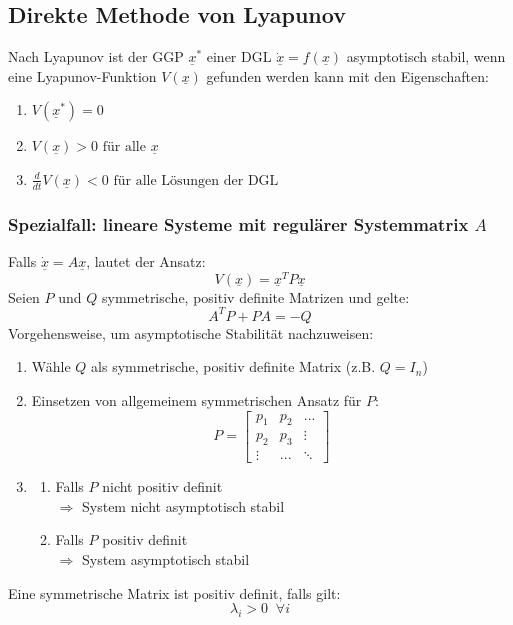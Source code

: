 \documentclass[a4paper,twocolumn,10pt]{article}
\begin{document}
\subsection{Direkte Methode von Lyapunov}
Nach Lyapunov ist der GGP $\underline{x}^*$ einer DGL $\underline{\dot{x}}=f(\underline{x})$ asymptotisch stabil, wenn eine Lyapunov-Funktion $V(\underline{x})$ gefunden werden kann mit den Eigenschaften:
\begin{enumerate}
\item $V(\underline{x}^*)=0$
\item $V(\underline{x})>0\text{ für alle }\underline{x}$
\item $\frac{d}{dt}V(\underline{x})<0\text{ für alle Lösungen der DGL}$
\end{enumerate}

\subsubsection{Spezialfall: lineare Systeme mit regulärer Systemmatrix $A$}
Falls $\underline{\dot{x}}=A\underline{x}$, lautet der Ansatz:
\begin{equation*}
V(\underline{x})=\underline{x}^TP\underline{x}
\end{equation*}
Seien $P$ und $Q$ symmetrische, positiv definite Matrizen und gelte:
\begin{equation*}
A^TP+PA=-Q
\end{equation*}
Vorgehensweise, um asymptotische Stabilität nachzuweisen:
\begin{enumerate}
\item Wähle $Q$ als symmetrische, positiv definite Matrix (z.B. $Q=I_n$)
\item Einsetzen von allgemeinem symmetrischen Ansatz für $P$:
\begin{equation*}
P=\begin{bmatrix}p_1 & p_2 & ... \\ p_2 & p_3 & \vdots \\ \vdots & ... & \ddots\end{bmatrix}
\end{equation*}
\item
\begin{enumerate}[label=$\bullet$]
\item Falls $P$ nicht positiv definit\\
$\Rightarrow$ System nicht asymptotisch stabil
\item Falls $P$ positiv definit\\
$\Rightarrow$ System asymptotisch stabil
\end{enumerate}
\end{enumerate}
Eine symmetrische Matrix ist positiv definit, falls gilt:
\begin{equation*}
\lambda_i>0\;\;\forall i
\end{equation*}
\end{document}
